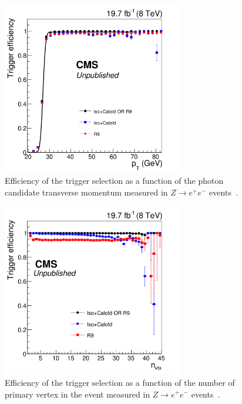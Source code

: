\begin{figure}[ht]
 \begin{center}
    \includegraphics[width=0.70\textwidth]{figures/data/turnon_pt.pdf}
      \end{center}
\caption{Efficiency of the trigger selection as a function of the photon candidate transverse
momentum measured in $Z\rightarrow e^+ e^-$ events~\cite{HggCMSpaper}.}
\label{fig:ZeeTriggerPt}
\end{figure}

\begin{figure}[ht]
 \begin{center}
    \includegraphics[width=0.70\textwidth]{figures/data/turnon_nvtx.pdf}
      \end{center}
\caption{Efficiency of the trigger selection as a function of the number of primary vertex in the event
measured in $Z\rightarrow e^+ e^-$ events~\cite{HggCMSpaper}.}
\label{fig:ZeeTriggerNvtx}
\end{figure}


